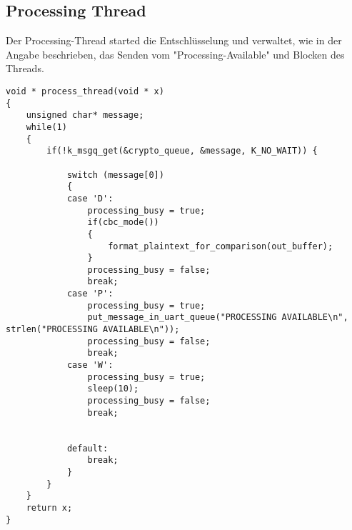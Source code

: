 \subsection{Processing Thread}
    Der Processing-Thread started die Entschlüsselung und verwaltet, wie in der Angabe beschrieben, das Senden vom "Processing-Available" und Blocken des Threads.
    \begin{lstlisting}[style=StyleC, captionpos=b, caption=Processing-Thread, label=Processing-Thread]
void * process_thread(void * x) 
{
    unsigned char* message;
    while(1)
    {
        if(!k_msgq_get(&crypto_queue, &message, K_NO_WAIT)) {
            
            switch (message[0])
            {
            case 'D':
                processing_busy = true; 
                if(cbc_mode())
                {
                    format_plaintext_for_comparison(out_buffer);
                }
                processing_busy = false;
                break;
            case 'P':
                processing_busy = true;
                put_message_in_uart_queue("PROCESSING AVAILABLE\n", strlen("PROCESSING AVAILABLE\n"));
                processing_busy = false;
                break; 
            case 'W':
                processing_busy = true; 
                sleep(10);
                processing_busy = false; 
                break; 
            
            
            default:
                break;
            }
        }
    }
    return x;
}        
    \end{lstlisting}


\newpage
